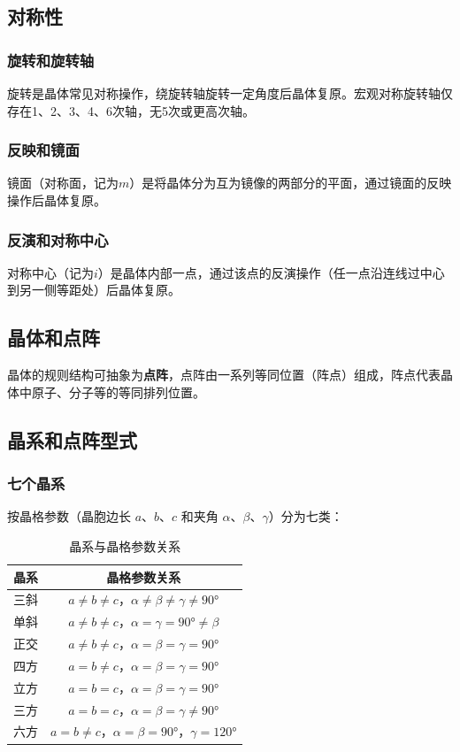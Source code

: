 \subsection{对称性}
\subsubsection{旋转和旋转轴}
旋转是晶体常见对称操作，绕旋转轴旋转一定角度后晶体复原。宏观对称旋转轴仅存在1、2、3、4、6次轴，无5次或更高次轴。

\subsubsection{反映和镜面}
镜面（对称面，记为$m$）是将晶体分为互为镜像的两部分的平面，通过镜面的反映操作后晶体复原。

\subsubsection{反演和对称中心}
对称中心（记为$i$）是晶体内部一点，通过该点的反演操作（任一点沿连线过中心到另一侧等距处）后晶体复原。

\subsection{晶体和点阵}
晶体的规则结构可抽象为\textbf{点阵}，点阵由一系列等同位置（阵点）组成，阵点代表晶体中原子、分子等的等同排列位置。

\subsection{晶系和点阵型式}
\subsubsection{七个晶系}
按晶格参数（晶胞边长 $a$、$b$、$c$ 和夹角 $\alpha$、$\beta$、$\gamma$）分为七类：

\begin{table}[h!]
  \centering
  \caption*{晶系与晶格参数关系}
  \begin{tabular}{lc}
    \toprule
    \textbf{晶系} & \textbf{晶格参数关系} \\
    \midrule
    三斜 & $a \neq b \neq c$，$\alpha \neq \beta \neq \gamma \neq \ang{90}$ \\
    单斜 & $a \neq b \neq c$，$\alpha = \gamma = \ang{90} \neq \beta$ \\
    正交 & $a \neq b \neq c$，$\alpha = \beta = \gamma = \ang{90}$ \\
    四方 & $a = b \neq c$，$\alpha = \beta = \gamma = \ang{90}$ \\
    立方 & $a = b = c$，$\alpha = \beta = \gamma = \ang{90}$ \\
    三方 & $a = b = c$，$\alpha = \beta = \gamma \neq \ang{90}$ \\
    六方 & $a = b \neq c$，$\alpha = \beta = \ang{90}$，$\gamma = \ang{120}$ \\
    \bottomrule
  \end{tabular}
\end{table}

